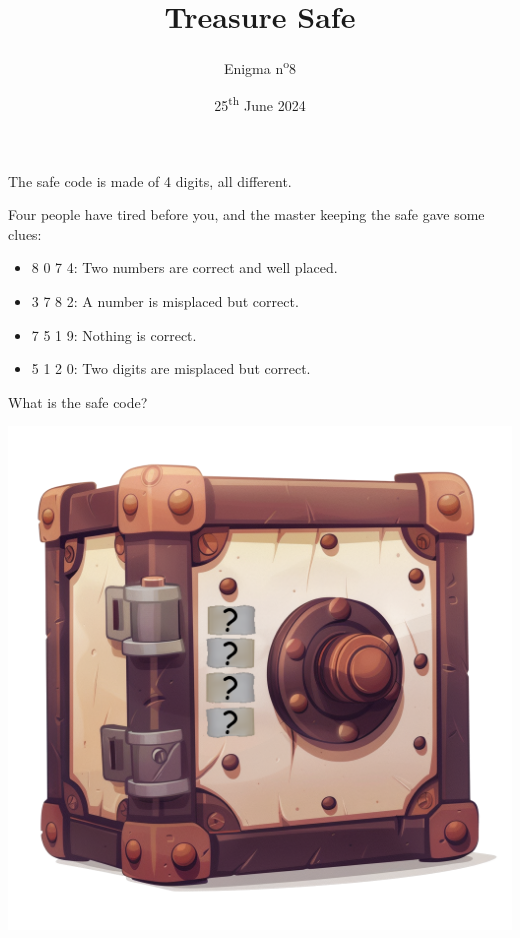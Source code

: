 \documentclass[a4paper, top=10mm]{article}
\title{\textbf{\huge{Treasure Safe}}}
\author{Enigma n\textsuperscript{o}8}
\date{25\textsuperscript{th} June 2024}
\begin{document}
	\maketitle
	
	\Large
	The safe code is made of 4 digits, all different.
	
	Four people have tired before you, and the master keeping the safe gave some clues:
	\begin{itemize}
		\item 8 0 7 4: Two numbers are correct and well placed.
		\item 3 7 8 2: A number is misplaced but correct.
		\item 7 5 1 9: Nothing is correct.
		\item 5 1 2 0: Two digits are misplaced but correct.
	\end{itemize}
	
	What is the safe code?
	
	\vspace{2cm}
	
	\begin{center}
		\includegraphics[width=\linewidth]{08safe.png}
	\end{center}
	
	
	
\end{document}
